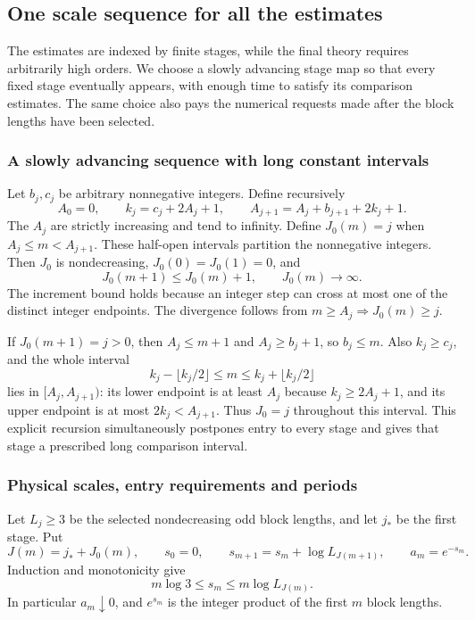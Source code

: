 \subsection{One scale sequence for all the estimates}
\label{sec:common-scale-selection}
The estimates are indexed by finite stages, while the final theory
requires arbitrarily high orders. We choose a slowly advancing
stage map so that every fixed stage eventually appears, with enough
time to satisfy its comparison estimates. The same choice also
pays the numerical requests made after the block lengths have
been selected.

\subsubsection{A slowly advancing sequence with long constant intervals}
Let $b_j,c_j$ be arbitrary nonnegative integers. Define recursively
\[
 A_0=0,\qquad k_j=c_j+2A_j+1,\qquad
                       A_{j+1}=A_j+b_{j+1}+2k_j+1.
\]
The $A_j$ are strictly increasing and tend to infinity. Define
$J_0(m)=j$ when $A_j\le m<A_{j+1}$. These half-open intervals
partition the nonnegative integers. Then $J_0$ is nondecreasing,
$J_0(0)=J_0(1)=0$, and
\[
 J_0(m+1)\le J_0(m)+1,\qquad J_0(m)\longrightarrow\infty.
\]
The increment bound holds because an integer step can cross at
most one of the distinct integer endpoints. The divergence follows
from $m\ge A_j\Rightarrow J_0(m)\ge j$.

If $J_0(m+1)=j>0$, then $A_j\le m+1$ and
$A_j\ge b_j+1$, so $b_j\le m$. Also $k_j\ge c_j$, and the
whole interval
\begin{equation}\label{eq:common-long-plateau}
       k_j-\lfloor k_j/2\rfloor\le m
                        \le k_j+\lfloor k_j/2\rfloor
\end{equation}
lies in $[A_j,A_{j+1})$: its lower endpoint is at least $A_j$
because $k_j\ge2A_j+1$, and its upper endpoint is at most
$2k_j<A_{j+1}$. Thus $J_0=j$ throughout this interval. This
explicit recursion simultaneously postpones entry to every stage
and gives that stage a prescribed long comparison interval.

\subsubsection{Physical scales, entry requirements and periods}
Let $L_j\ge3$ be the selected nondecreasing odd block lengths,
and let $j_*$ be the first stage. Put
\[
 J(m)=j_*+J_0(m),\qquad s_0=0,\qquad
 s_{m+1}=s_m+\log L_{J(m+1)},\qquad a_m=e^{-s_m}.
\]
Induction and monotonicity give
\begin{equation}\label{eq:common-scale-brackets}
         m\log3\le s_m\le m\log L_{J(m)}.
\end{equation}
In particular $a_m\downarrow0$, and $e^{s_m}$ is the integer
product of the first $m$ block lengths.

